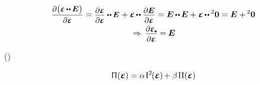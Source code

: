 \nopagebreak\vspace{-0.66em}
\begin{multline}\label{thederivativeoftracebythetensoritself}
\scalebox{.92}{$
   \displaystyle
   \frac{\raisemath{-0.133em}{
      \partial \bigl( \infinitesimaldeformation \hspace{-0.1ex} \dotdotp \hspace{-0.1ex} \UnitDyad \hspace{.1ex} \bigr)
   }}
   { \raisemath{-0.07em}{\partial \infinitesimaldeformation} }
$}
=
\scalebox{.92}{$
   \displaystyle
   \frac{\raisemath{-0.133em}{ \partial \infinitesimaldeformation }}{ \raisemath{-0.07em}{\partial \infinitesimaldeformation} }
   \dotdotp
   \hspace{-0.1ex} \UnitDyad \hspace{.1ex}
$}
+
\infinitesimaldeformation \hspace{-0.2ex}
\dotdotp
\scalebox{.92}{$
   \displaystyle
   \frac{\raisemath{-0.133em}{ \partial \UnitDyad }}{ \raisemath{-0.07em}{\partial \infinitesimaldeformation} }
$}
=
\UnitDyad \hspace{-0.1ex} \dotdotp \hspace{-0.2ex} \UnitDyad
+
\infinitesimaldeformation \hspace{-0.2ex} \dotdotp \hspace{-0.1ex} \zerobivalent
=
\UnitDyad + \hspace{-0.2ex} \zerobivalent
%
\\
%
\hspace{.4ex} \Rightarrow \hspace{.4ex}
%
\scalebox{.92}{$
   \displaystyle
   \frac{\raisemath{-0.133em}{
      \partial \infinitesimaldeformation\tracedot
   }}
   { \raisemath{-0.07em}{\partial \infinitesimaldeformation} }
$}
= \hspace{-0.1ex}
\UnitDyad
\end{multline}

()

\nopagebreak\vspace{-0.2em}
\begin{equation}\label{theelasticpotentialforanisotropicmedium}
\potentialenergydensity(\infinitesimaldeformation) =
\alpha \hspace{.2ex} \anyfirstinvariant^2 \hspace{-0.2ex} (\infinitesimaldeformation) \hspace{-0.2ex}
+ \beta \hspace{.2ex} \anysecondinvariant (\infinitesimaldeformation)
\end{equation}

